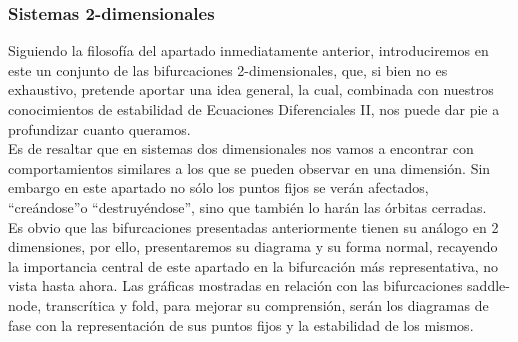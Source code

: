 \subsubsection{Sistemas 2-dimensionales}
Siguiendo la filosofía del apartado inmediatamente anterior, introduciremos en este un conjunto de las bifurcaciones 2-dimensionales, que, si bien no es exhaustivo, pretende aportar una idea general, la cual, combinada con nuestros conocimientos de estabilidad de Ecuaciones Diferenciales II, nos puede dar pie a profundizar cuanto queramos. \\
Es de resaltar que en sistemas dos dimensionales nos vamos a encontrar con comportamientos similares a los que se pueden observar en una dimensión. Sin embargo en este apartado no sólo los puntos fijos se verán afectados, \textquotedblleft creándose\textquotedblright o \textquotedblleft destruyéndose\textquotedblright, sino que también lo harán las órbitas cerradas.\\
Es obvio que las bifurcaciones presentadas anteriormente tienen su análogo en 2 dimensiones, por ello, presentaremos su diagrama y su forma normal, recayendo la importancia central de este apartado en la bifurcación más representativa, no vista hasta ahora. Las gráficas mostradas en relación con las bifurcaciones saddle-node, transcrítica y fold, para mejorar su comprensión, serán los diagramas de fase con la representación de sus puntos fijos y la estabilidad de los mismos.
